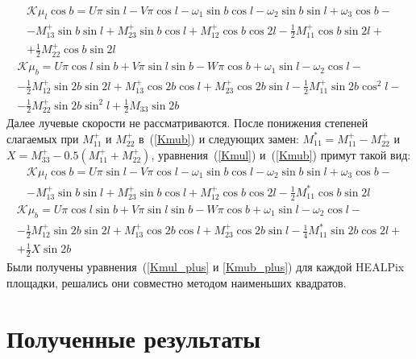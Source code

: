 \documentclass[14pt]{article} %
\begin{document}
\begin{multline}\label{Kmul}
\mathcal{K}\mu_l\cos b=U\pi\sin l-V\pi\cos l-\omega_1\sin b\cos l-\omega_2\sin b\sin l+\omega_3\cos b-\\-M_{13}^+\sin b\sin l+M_{23}^+\sin b\cos l+M_{12}^+\cos b\cos2l-\frac{1}{2}M_{11}^+\cos b\sin2l+\\+\frac{1}{2}M_{22}^+\cos b\sin2l
\end{multline}
\begin{multline}\label{Kmub}
\mathcal{K}\mu_b=U\pi\cos l\sin b+V\pi\sin l\sin b-W\pi\cos b+\omega_1\sin l-\omega_2\cos l-\\-\frac{1}{2}M_{12}^+\sin2b\sin2l+M_{13}^+\cos2b\cos l+M_{23}^+\cos2b\sin l-\frac{1}{2}M_{11}^+\sin2b\cos^2l-\\-\frac{1}{2}M_{22}^+\sin2b\sin^2l+\frac{1}{2}M_{33}\sin2b
\end{multline}
Далее лучевые скорости не рассматриваются. После понижения степеней слагаемых при $M_{11}^+$ и $M_{22}^+$ в~(\ref{Kmub}) и следующих замен: $M_{11}^*=M_{11}^+-M_{22}^+$ и $X=M_{33}^+-0.5\left(M_{11}^++M_{22}^+\right)$, уравнения~(\ref{Kmul}) и~(\ref{Kmub}) примут такой вид:
\begin{multline}\label{Kmul_plus}
\mathcal{K}\mu_l\cos b=U\pi\sin l-V\pi\cos l-\omega_1\sin b\cos l-\omega_2\sin b\sin l+\omega_3\cos b-\\-M_{13}^+\sin b\sin l+M_{23}^+\sin b\cos l+M_{12}^+\cos b\cos2l-\frac{1}{2}M_{11}^*\cos b\sin2l
\end{multline}
\begin{multline}\label{Kmub_plus}
\mathcal{K}\mu_b=U\pi\cos l\sin b+V\pi\sin l\sin b-W\pi\cos b+\omega_1\sin l-\omega_2\cos l-\\-\frac{1}{2}M_{12}^+\sin2b\sin2l+M_{13}^+\cos2b\cos l+M_{23}^+\cos2b\sin l-\frac{1}{4}M_{11}^*\sin2b\cos2l+\\+\frac{1}{2}X\sin2b
\end{multline}
Были получены уравнения~(\ref{Kmul_plus} и \ref{Kmub_plus}) для каждой HEALPix площадки, решались они совместно методом наименьших квадратов.
\section{Полученные результаты}
\end{document}
